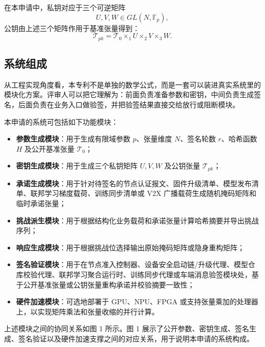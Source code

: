 \documentclass[12pt,a4paper]{article}
\begin{document}
在本申请中，私钥对应于三个可逆矩阵
\[
U,V,W \in GL(N,\mathbb{F}_p),
\]
公钥由上述三个矩阵作用于基准张量得到：
\[
\mathcal{T}_{pk}=\mathcal{T}_0 \times_1 U \times_2 V \times_3 W.
\]

\subsection{系统组成}

从工程实现角度看，本专利不是单独的数学公式，而是一套可以装进真实系统里的模块化方案。评审人可以把它理解为：前面负责准备参数和密钥，中间负责生成签名，后面负责在业务入口做验签，并把验签结果直接交给放行或阻断模块。

本申请的系统可包括如下功能模块：

\begin{itemize}
    \item \textbf{参数生成模块}：用于生成有限域参数 $p$、张量维度 $N$、签名轮数 $r$、哈希函数 $H$ 及公开基准张量 $\mathcal{T}_0$；
    \item \textbf{密钥生成模块}：用于生成三个私钥矩阵 $U,V,W$ 及公钥张量 $\mathcal{T}_{pk}$；
    \item \textbf{承诺生成模块}：用于针对待签名的节点认证报文、固件升级清单、模型发布清单、联邦学习梯度载荷、训练同步清单或 V2X 广播载荷生成随机掩码矩阵和临时承诺张量；
    \item \textbf{挑战派生模块}：用于根据结构化业务载荷和承诺张量计算哈希摘要并导出挑战序列；
    \item \textbf{响应生成模块}：用于根据挑战位选择输出原始掩码矩阵或隐身重构矩阵；
    \item \textbf{签名验证模块}：用于在节点准入控制器、设备安全启动链/升级代理、模型仓库校验代理、联邦学习聚合运行时、训练同步代理或车端消息验签模块处，基于公开基准张量或公钥张量重构承诺并校验摘要一致性；
    \item \textbf{硬件加速模块}：可选地部署于 GPU、NPU、FPGA 或支持张量乘加的处理器上，以实现矩阵乘法和张量收缩的并行计算。
\end{itemize}

上述模块之间的协同关系如图 1 所示。图 1 展示了公开参数、密钥生成、签名生成、签名验证以及硬件加速支撑之间的对应关系，用于说明本申请的系统构成。
\end{document}
